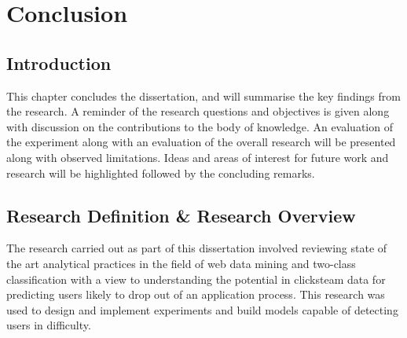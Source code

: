 \chapter{Conclusion} %

\label{Chapter5} %



\section{Introduction}
This chapter concludes the dissertation, and will summarise the key findings from the research. A reminder of the research questions and objectives is given along with discussion on the contributions to the body of knowledge.
An evaluation of the experiment along with an evaluation of the overall research will be presented along with observed limitations. Ideas and areas of interest for future work and research will be highlighted followed by the concluding remarks.




\section{Research Definition \& Research Overview}
The research carried out as part of this dissertation involved reviewing state of the art analytical practices in the field of web data mining and two-class classification with a view to understanding the potential in clicksteam data for predicting users likely to drop out of an application process. This research was used to design and implement experiments and build models capable of detecting users in difficulty. 


